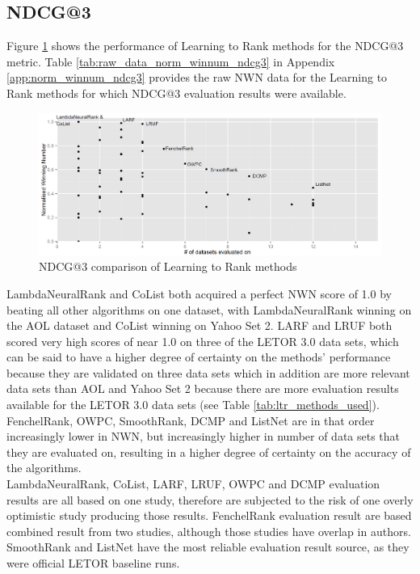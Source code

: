 \subsection{NDCG@3}
Figure \ref{fig:normalised_winning_number_NDCG3} shows the performance of Learning to Rank methods for the \ac{NDCG}@3 metric. Table \ref{tab:raw_data_norm_winnum_ndcg3} in Appendix \ref{app:norm_winnum_ndcg3} provides the raw \ac{NWN} data for the Learning to Rank methods for which \ac{NDCG}@3 evaluation results were available.\\

\begin{figure}[!h]
\includegraphics[scale=0.285]{gfx/ndcg3_winnum}
\caption{\acs{NDCG}@3 comparison of Learning to Rank methods}
\label{fig:normalised_winning_number_NDCG3}
\end{figure}

LambdaNeuralRank and CoList both acquired a perfect \ac{NWN} score of 1.0 by beating all other algorithms on one dataset, with LambdaNeuralRank winning on the AOL dataset and CoList winning on Yahoo Set 2. LARF and LRUF both scored very high scores of near 1.0 on three of the LETOR 3.0 data sets, which can be said to have a higher degree of certainty on the methods' performance because they are validated on three data sets which in addition are more relevant data sets than AOL and Yahoo Set 2 because there are more evaluation results available for the LETOR 3.0 data sets (see Table \ref{tab:ltr_methods_used}). FenchelRank, OWPC, SmoothRank, DCMP and ListNet are in that order increasingly lower in \ac{NWN}, but increasingly higher in number of data sets that they are evaluated on, resulting in a higher degree of certainty on the accuracy of the algorithms.\\

LambdaNeuralRank, CoList, LARF, LRUF, OWPC and DCMP evaluation results are all based on one study, therefore are subjected to the risk of one overly optimistic study producing those results. FenchelRank evaluation result are based combined result from two studies, although those studies have overlap in authors. SmoothRank and ListNet have the most reliable evaluation result source, as they were official LETOR baseline runs.  

